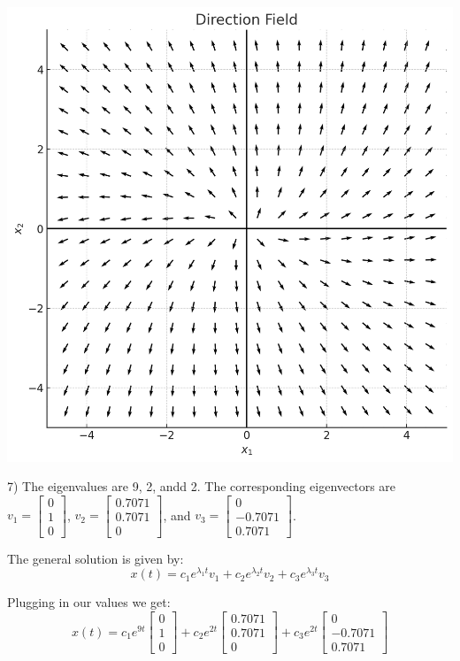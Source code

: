 \documentclass{article}
\begin{document}
\includegraphics[width=\linewidth]{5_5_4_direction_field}


7) The eigenvalues are 9, 2, andd 2. The corresponding eigenvectors are
$v_1 = \begin{bmatrix}
    0 \\
    1 \\
    0
\end{bmatrix}$, $v_2 = \begin{bmatrix}
    0.7071 \\
    0.7071 \\
    0
\end{bmatrix}$, and $v_3 = \begin{bmatrix}
    0 \\
    -0.7071 \\
    0.7071
\end{bmatrix}$.

The general solution is given by:
\[x(t) = c_1 e^{\lambda_1 t} v_1 + c_2 e^{\lambda_2 t} v_2 + c_3 e^{\lambda_3 t} v_3\]

Plugging in our values we get:
\[x(t) = c_1 e^{9 t} \begin{bmatrix}
    0 \\
    1 \\
    0
\end{bmatrix} + c_2 e^{2 t} \begin{bmatrix}
    0.7071 \\
    0.7071 \\
    0
\end{bmatrix} + c_3 e^{2 t} \begin{bmatrix}
    0 \\
    -0.7071 \\
    0.7071
\end{bmatrix}\]
\end{document}
